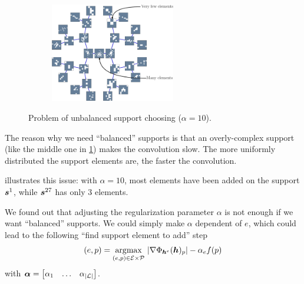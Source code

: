 \begin{figure}[!h] \centering
\begin{subfigure}[b]{1\textwidth}\centering
\includegraphics[width=0.6\textwidth]{figures/tree-unbalanced-supp/tree-unbalanced.pdf}
\end{subfigure}
\caption{Problem of unbalanced support choosing ($\alpha=10$).}\label{fig_unbalanced_supports}
\end{figure}


\noindent
The reason why we need “balanced” supports is that an overly-complex support (like the middle one in \cref{fig_unbalanced_supports}) makes the convolution slow. The more uniformly distributed the support elements are, the faster the convolution.


\noindent
{} illustrates this issue: with $\alpha=10$, most elements have been added on the support $\bm{s}^1$, while $\bm{s}^{27}$ has only 3 elements.

\noindent
We found out that adjusting the regularization parameter $\alpha$ is not enough if we want “balanced” supports. We could simply make $\alpha$ dependent of $e$, which could lead to the following “find support element to add” step
\begin{equation}
(e,p) = \underset{(e,p) \in \mathcal E \times \mathcal P}{\operatorname*{\arg\!\max}}~ |\nabla \Phi_{\bm{h}^e}(\bm{h})_p| - \alpha_e f(p)
\end{equation}
with $\bm{\alpha} = \begin{bmatrix}\alpha_1 & \dots & \alpha_{|\mathcal L|}\end{bmatrix}$.

